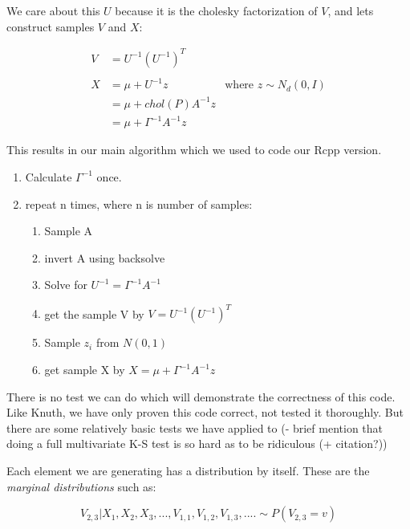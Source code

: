 \documentclass[english]{report}
\begin{document}
We care about this $U$ because it is the cholesky factorization of $V$, and lets construct samples $V$ and $X$:

\begin{align*}
V & =U^{-1}\left(U^{-1}\right)^{T}\\
\\
X & =\mu+U^{-1}z & \text{where }z\sim N_{d}(0,I)\\
 & =\mu+chol(P)A^{-1}z\\
 & =\mu+\Gamma^{-1}A^{-1}z
\end{align*}

This results in our main algorithm which we used to code our Rcpp version.

\begin{enumerate}
\item Calculate $\Gamma^{-1}$ once.
\item repeat n times, where n is number of samples:
\begin{enumerate}
		\item Sample A
		\item invert A using backsolve
		\item Solve for $U^{-1} = \Gamma^{-1}A^{-1}$\\
		\item get the sample V by $V = U^{-1}\left(U^{-1}\right)^{T}$\\
		\item Sample $z_i$ from $N(0,1)$ \\
		\item get sample X by $X = \mu+\Gamma^{-1}A^{-1}z$
\end{enumerate}

\end{enumerate}




There is no test we can do which will demonstrate the correctness of this code.
Like Knuth, we have only proven this code correct, not tested it thoroughly.
But there are some relatively basic tests we have applied to 
(- brief mention that doing a full multivariate K-S test is so hard as to be ridiculous (+ citation?))

Each element we are generating has a distribution by itself. These are the \emph{marginal distributions} such as:

$$ V_{2,3} | X_1, X_2, X_3, ..., V_{1,1}, V_{1,2}, V_{1,3} , ....  \sim P(V_{2,3} = v) $$
\end{document}
